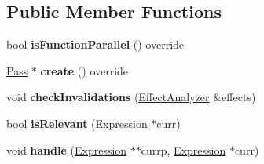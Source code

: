\subsection*{Public Member Functions}
\begin{DoxyCompactItemize}
\item 
\mbox{\label{structwasm_1_1_local_c_s_e_affa5971d8d424a260b6a482b5965f82e}} 
bool {\bfseries is\+Function\+Parallel} () override
\item 
\mbox{\label{structwasm_1_1_local_c_s_e_a0d5ee3561f87e9343d1ed65ef86049a6}} 
\mbox{\hyperlink{classwasm_1_1_pass}{Pass}} $\ast$ {\bfseries create} () override
\item 
\mbox{\label{structwasm_1_1_local_c_s_e_a6ce8f54bde1c61ed94cfd2fb1e4b64b0}} 
void {\bfseries check\+Invalidations} (\mbox{\hyperlink{structwasm_1_1_effect_analyzer}{Effect\+Analyzer}} \&effects)
\item 
\mbox{\label{structwasm_1_1_local_c_s_e_aa90a118bb4d3be7271a232f1944982eb}} 
bool {\bfseries is\+Relevant} (\mbox{\hyperlink{classwasm_1_1_expression}{Expression}} $\ast$curr)
\item 
\mbox{\label{structwasm_1_1_local_c_s_e_a1242ca8549cf688f2d98a7fa29bf5ac5}} 
void {\bfseries handle} (\mbox{\hyperlink{classwasm_1_1_expression}{Expression}} $\ast$$\ast$currp, \mbox{\hyperlink{classwasm_1_1_expression}{Expression}} $\ast$curr)
\end{DoxyCompactItemize}
